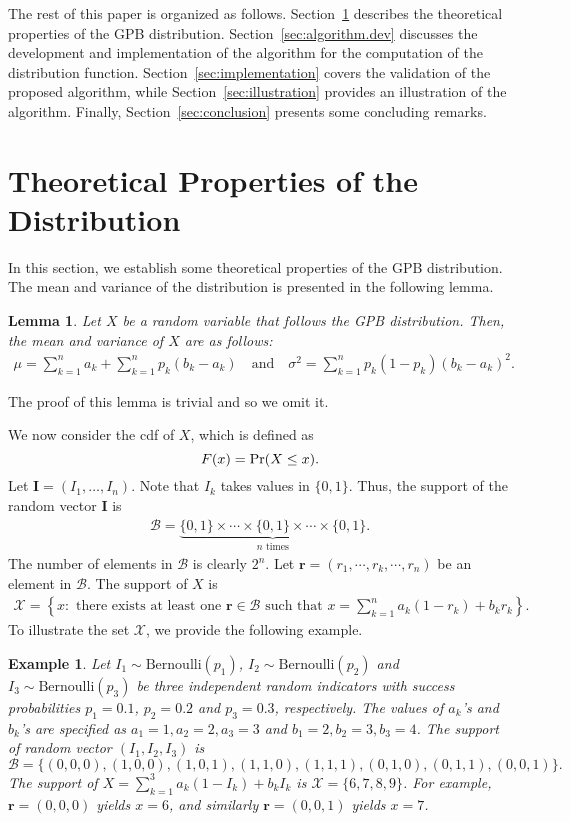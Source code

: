 \documentclass[12pt]{article}
\newcommand{\Ivec}{{\boldsymbol{I}}}
\newcommand{\Bset}{\mathcal{B}}
\newcommand{\Xset}{\mathcal{X}}
\newcommand{\pr}{{\rm Pr}}
\newcommand{\ber}{\textrm{Bernoulli}}
\newcommand{\rvec}{\boldsymbol{r}}
\newtheorem{example}{Example}
\newtheorem{lemma}{Lemma}
\begin{document}
The rest of this paper is organized as follows. Section~\ref{sec:properties} describes the theoretical properties of the GPB distribution. Section~\ref{sec:algorithm.dev} discusses the development and implementation of the algorithm for the computation of the distribution function. Section~\ref{sec:implementation} covers the validation of the proposed algorithm, while Section~\ref{sec:illustration} provides an illustration of the algorithm. Finally, Section~\ref{sec:conclusion} presents some concluding remarks.


\section{Theoretical Properties of the Distribution}\label{sec:properties}
In this section, we establish some theoretical properties of the GPB distribution. The mean and variance of the distribution is presented in the following lemma.
\begin{lemma}
Let $X$ be a random variable that follows the GPB distribution. Then, the mean and variance of $X$ are as follows:
\begin{align*}
\mu=\sum_{k=1}^na_k+\sum_{k=1}^np_k(b_k-a_k) \quad \textrm{and}\quad \sigma^2=\sum_{k=1}^np_k(1-p_k)(b_k-a_k)^2.
\end{align*}
\end{lemma}
The proof of this lemma is trivial and so we omit it.

We now consider the cdf of $X$, which is defined as
$$F(x)=\pr(X\leq x).$$
Let $\Ivec=(I_1,\dots, I_n)$. Note that $I_k$ takes values in $\{0, 1\}$. Thus, the support of the random vector $\Ivec$ is
\begin{align*}
\Bset=\underbrace{\{0,1\}\times\cdots\times\{0,1\}\times\cdots \times \{0,1\}}_{n \textrm{ times}}.
\end{align*}
The number of elements in $\Bset$ is clearly $2^{n}$. Let $\rvec=(r_1, \cdots, r_k, \cdots, r_n)$ be an element in $\Bset$. The support of $X$ is
\begin{align*}
\Xset=\left\{x: \textrm{ there exists at least one } \rvec\in\Bset \textrm{ such that } x=\sum_{k=1}^na_k(1-r_k)+b_kr_k\right\}.
\end{align*}
To illustrate the set $\Xset$, we provide the following example.
\begin{example}\label{eg:eg1}
Let $I_1\sim\ber(p_1)$, $I_2\sim\ber(p_2)$ and $I_3\sim\ber(p_3)$ be three independent random indicators with success probabilities $p_1=0.1$, $p_2=0.2$ and  $p_3=0.3$, respectively. The values of $a_k$'s and $b_k$'s are specified as $a_1=1, a_2=2, a_3=3$ and $b_1=2, b_2=3, b_3=4$. The support of random vector $(I_1, I_2, I_3)$ is
$$\Bset= \{(0, 0, 0), (1, 0, 0), (1, 0, 1), (1, 1, 0), (1, 1, 1), (0, 1, 0), (0, 1, 1), (0, 0, 1)\}.$$
The support of $X=\sum_{k=1}^3a_k(1-I_k)+b_kI_k$ is $\Xset=\{6, 7, 8, 9\}$. For example, $\rvec=(0, 0, 0)$ yields $x=6$, and similarly $\rvec=(0, 0, 1)$ yields $x=7$.
\end{example}
\end{document}

